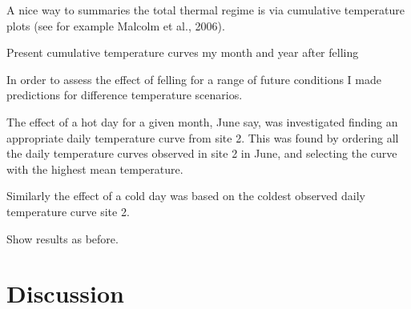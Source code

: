 A nice way to summaries the total thermal regime is via cumulative temperature plots (see for example Malcolm et al., 2006).

Present cumulative temperature curves my month and year after felling

In order to assess the effect of felling for a range of future conditions I made predictions for difference temperature scenarios.

The effect of a hot day for a given month, June say, was investigated finding an appropriate daily temperature curve from site 2. This was found by ordering all the daily temperature curves observed in site 2 in June, and selecting the curve with the highest mean temperature.

Similarly the effect of a cold day was based on the coldest observed daily temperature curve site 2.

Show results as before.





\section{Discussion}

